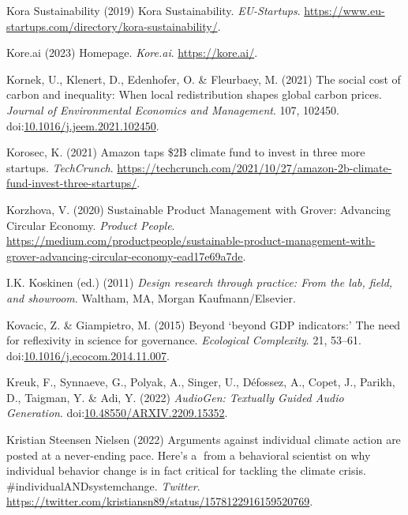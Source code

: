 \documentclass[
  letterpaper,
  DIV=11,
  numbers=noendperiod]{scrartcl}
\newlength{\cslhangindent}
\newenvironment{CSLReferences}[2] %
 {\begin{list}{}{%
  \setlength{\itemindent}{0pt}
  \setlength{\leftmargin}{0pt}
  \setlength{\parsep}{0pt}
  \ifodd #1
   \setlength{\leftmargin}{\cslhangindent}
   \setlength{\itemindent}{-1\cslhangindent}
  \fi
  \setlength{\itemsep}{#2\baselineskip}}}
 {\end{list}}
\begin{document}
\begin{CSLReferences}{0}{1}
Kora Sustainability (2019) Kora {Sustainability}. \emph{EU-Startups}.
\url{https://www.eu-startups.com/directory/kora-sustainability/}.

Kore.ai (2023) Homepage. \emph{Kore.ai}. \url{https://kore.ai/}.

Kornek, U., Klenert, D., Edenhofer, O. \& Fleurbaey, M. (2021) The
social cost of carbon and inequality: {When} local redistribution shapes
global carbon prices. \emph{Journal of Environmental Economics and
Management}. 107, 102450.
doi:\href{https://doi.org/10.1016/j.jeem.2021.102450}{10.1016/j.jeem.2021.102450}.

Korosec, K. (2021) Amazon taps \${2B} climate fund to invest in three
more startups. \emph{TechCrunch}.
\url{https://techcrunch.com/2021/10/27/amazon-2b-climate-fund-invest-three-startups/}.

Korzhova, V. (2020) Sustainable {Product Management} with {Grover}:
{Advancing Circular Economy}. \emph{Product People}.
\url{https://medium.com/productpeople/sustainable-product-management-with-grover-advancing-circular-economy-ead17e69a7de}.

I.K. Koskinen (ed.) (2011) \emph{Design research through practice: From
the lab, field, and showroom}. Waltham, MA, Morgan Kaufmann/Elsevier.

Kovacic, Z. \& Giampietro, M. (2015) Beyond {`beyond {GDP} indicators:'}
{The} need for reflexivity in science for governance. \emph{Ecological
Complexity}. 21, 53--61.
doi:\href{https://doi.org/10.1016/j.ecocom.2014.11.007}{10.1016/j.ecocom.2014.11.007}.

Kreuk, F., Synnaeve, G., Polyak, A., Singer, U., Défossez, A., Copet,
J., Parikh, D., Taigman, Y. \& Adi, Y. (2022) \emph{{AudioGen}:
{Textually Guided Audio Generation}}.
doi:\href{https://doi.org/10.48550/ARXIV.2209.15352}{10.48550/ARXIV.2209.15352}.

Kristian Steensen Nielsen (2022) Arguments against individual climate
action are posted at a never-ending pace. {Here}'s a 🧵from a behavioral
scientist on why individual behavior change is in fact critical for
tackling the climate crisis. \#{individualANDsystemchange}.
\emph{Twitter}.
\url{https://twitter.com/kristiansn89/status/1578122916159520769}.


\end{CSLReferences}
\end{document}
